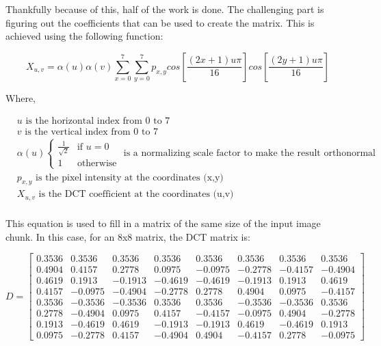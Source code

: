 \documentclass[11pt]{article}
\begin{document}
Thankfully because of this, half of the work is done.
The challenging part is figuring out the coefficients that can be used to create the matrix.
This is achieved using the following function:

\begin{equation}
  \label{eqn:dct}
  X_{u,v} = \alpha(u) \alpha(v) \sum_{x=0}^{7} \sum_{y=0}^{7} p_{x,y} cos \left [  \frac{(2x+1)u\pi}{16} \right ] cos \left [  \frac{(2y+1)u\pi}{16} \right ]
\end{equation}

Where,

\begin{align*}
  &u \text{ is the horizontal index from 0 to 7} \\
  &v \text{ is the vertical index from 0 to 7} \\
  &\alpha(u) \left\{\begin{matrix}
    \frac{1}{\sqrt{2}} & \text{if } u=0 \\ 
    1 &  \text{otherwise}
  \end{matrix}\right. \text{ is a normalizing scale factor to make the result orthonormal} \\
  &p_{x,y} \text{ is the pixel intensity at the coordinates (x,y)} \\
  &X_{u,v} \text{ is the DCT coefficient at the coordinates (u,v)} \\
\end{align*}

This equation is used to fill in a matrix of the same size of the input image chunk.
In this case, for an 8x8 matrix, the DCT matrix is:

\begin{equation}
  \label{eqn:dctMatrix}
  D = \begin{bmatrix}
    0.3536 & 0.3536 & 0.3536 & 0.3536 & 0.3536 & 0.3536 & 0.3536 & 0.3536 \\
    0.4904 & 0.4157 & 0.2778 & 0.0975 &-0.0975 &-0.2778 &-0.4157 &-0.4904 \\
    0.4619 & 0.1913 &-0.1913 &-0.4619 &-0.4619 &-0.1913 & 0.1913 & 0.4619 \\
    0.4157 &-0.0975 &-0.4904 &-0.2778 & 0.2778 & 0.4904 & 0.0975 &-0.4157 \\
    0.3536 &-0.3536 &-0.3536 & 0.3536 & 0.3536 &-0.3536 &-0.3536 & 0.3536 \\
    0.2778 &-0.4904 & 0.0975 & 0.4157 &-0.4157 &-0.0975 & 0.4904 &-0.2778 \\
    0.1913 &-0.4619 & 0.4619 &-0.1913 &-0.1913 & 0.4619 &-0.4619 & 0.1913 \\
    0.0975 &-0.2778 & 0.4157 &-0.4904 & 0.4904 &-0.4157 & 0.2778 &-0.0975
  \end{bmatrix}
\end{equation}
\end{document}
